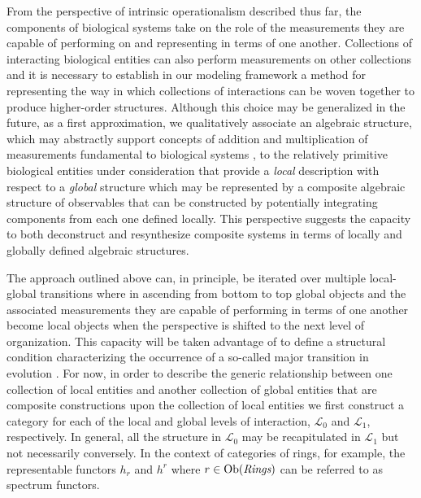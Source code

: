 \documentclass[aps,twocolumn]{revtex4-1}
\begin{document}
From the perspective of intrinsic operationalism described thus far, the components of biological systems take on the role of the measurements they are capable of performing on and representing in terms of one another. Collections of interacting biological entities can also perform measurements on other collections and it is necessary to establish in our modeling framework a method for representing the way in which collections of interactions can be woven together to produce higher-order structures. Although this choice may be generalized in the future, as a first approximation, we qualitatively associate an algebraic structure, which may abstractly support concepts of addition and multiplication of measurements fundamental to biological systems \cite{Houle2011}, to the relatively primitive biological entities under consideration that provide a {\it local} description with respect to a {\it global} structure which may be represented by a composite algebraic structure of observables that can be constructed by potentially integrating components from each one defined locally. This perspective suggests the capacity to both deconstruct and resynthesize composite systems in terms of locally and globally defined algebraic structures.

The approach outlined above can, in principle, be iterated over multiple local-global transitions where in ascending from bottom to top global objects and the associated measurements they are capable of performing in terms of one another become local objects when the perspective is shifted to the next level of organization. This capacity will be taken advantage of to define a structural condition characterizing the occurrence of a so-called major transition in evolution \cite{MaynardSmith1995,Okasha2006,Calcott2011}. For now, in order to describe the generic relationship between one collection of local entities and another collection of global entities that are composite constructions upon the collection of local entities we first construct a category for each of the local and global levels of interaction, $\mathcal{L}_0$ and $\mathcal{L}_1$, respectively. In general, all the structure in $\mathcal{L}_0$ may be recapitulated in $\mathcal{L}_1$ but not necessarily conversely. In the context of categories of rings, for example, the representable functors $h_r$ and $h^r$ where $r \in \mathop{\rm Ob}\nolimits(\textit{Rings})$ can be referred to as spectrum functors.

\end{document}
